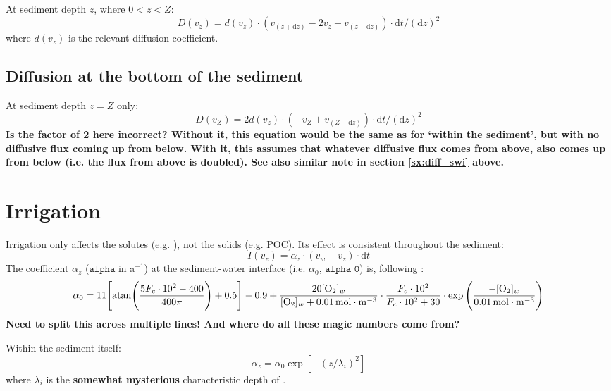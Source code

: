 \documentclass[a4paper]{article}
\newcommand{\D}[1]{\mathrm{d}#1}
\newcommand{\code}[1]{\texttt{#1}}
\newcommand{\molmmm}{\mathrm{mol}\cdot\mathrm{m}^{-3}}
\newcommand{\wtf}[1]{\textcolor{Cerulean}{\textbf{#1}}}
\begin{document}
At sediment depth $z$, where $0 < z < Z$:
\begin{equation}
D(v_z) = d(v_z) \cdot (v_{(z+\D{z})} - 2 v_z + v_{(z-\D{z})}) \cdot \D{t} / (\D{z})^2
\end{equation}
where $d(v_z)$ is the relevant diffusion coefficient.

\subsection{Diffusion at the bottom of the sediment}\label{sx:diff_bot}

At sediment depth $z = Z$ only:
\begin{equation}
D(v_Z) = 2 d(v_z) \cdot (-v_Z + v_{(Z-\D{z})}) \cdot \D{t} / (\D{z})^2
\end{equation}
\wtf{Is the factor of 2 here incorrect? Without it, this equation would be the same as for `within the sediment', but with no diffusive flux coming up from below. With it, this assumes that whatever diffusive flux comes from above, also comes up from below (i.e. the flux from above is doubled). See also similar note in section \ref{sx:diff_swi} above.}

\section{Irrigation}

Irrigation only affects the solutes (e.g. ), not the solids (e.g. POC). Its effect is consistent throughout the sediment:
\begin{equation}
I(v_z) = \alpha_z \cdot (v_w - v_z) \cdot \D{t}
\end{equation}
The coefficient $\alpha_z$ ($\code{alpha}$ in a$^{-1}$) at the sediment-water interface (i.e. $\alpha_0$, $\code{alpha\_0}$) is, following \citet{archer_model_2002}:
\begin{equation}
\alpha_0 = 11 \Bigg[ \mathrm{atan} \Bigg( \frac{5 F_c \cdot 10^2 - 400}{400 \pi} \Bigg) + 0.5 \Bigg] - 0.9 + \frac{20 [\ce{O2}]_w}{[\ce{O2}]_w + 0.01 \, \molmmm} \cdot \frac{F_c \cdot 10^2}{F_c \cdot 10^2 + 30} \cdot \exp \Bigg(\frac{-[\ce{O2}]_w}{0.01 \, \molmmm}\Bigg)
\end{equation}
\wtf{Need to split this across multiple lines! And where do all these magic numbers come from?}

Within the sediment itself:
\begin{equation}
\alpha_z = \alpha_0 \exp [-(z/\lambda_i)^2]
\end{equation}
where $\lambda_i$ is the \wtf{somewhat mysterious} characteristic depth of \citet{archer_model_2002}.


\end{document}
